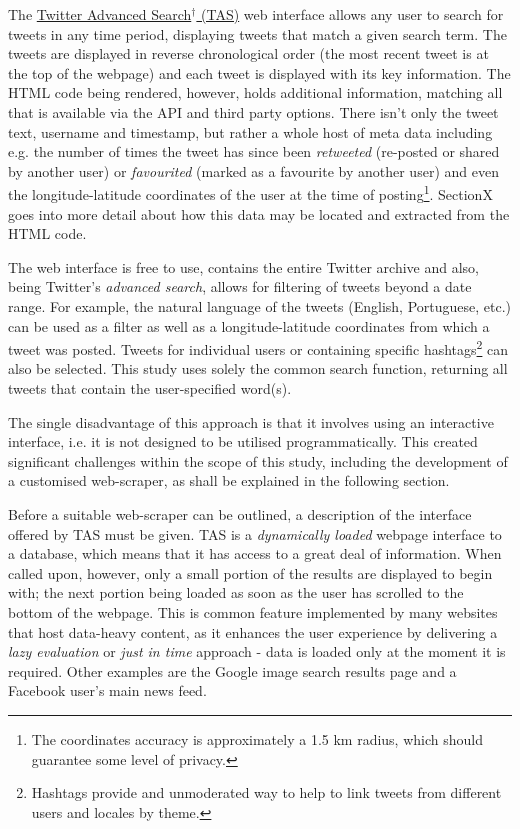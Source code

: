 \documentclass{article}
\begin{document}
The \href{https://twitter.com/search-advanced?lang\%3Den}{Twitter Advanced Search$^{\dag{}}$ (TAS)} web interface allows any user to search for tweets in any time period, displaying tweets that match a given search term. The tweets are displayed in reverse chronological order (the most recent tweet is at the top of the webpage) and each tweet is displayed with its key information. The HTML code being rendered, however, holds additional information, matching all that is available via the API and third party options. There isn't only the tweet text, username and timestamp, but rather a whole host of meta data including e.g. the number of times the tweet has since been \emph{retweeted} (re-posted or shared by another user) or \emph{favourited} (marked as a favourite by another user) and even the longitude-latitude coordinates of the user at the time of posting\footnote{The coordinates accuracy is approximately a 1.5 km radius, which should guarantee some level of privacy.}. SectionX goes into more detail about how this data may be located and extracted from the HTML code.

The web interface is free to use, contains the entire Twitter archive and also, being Twitter's \emph{advanced search}, allows for filtering of tweets beyond a date range. For example, the natural language of the tweets (English, Portuguese, etc.) can be used as a filter as well as a longitude-latitude coordinates from which a tweet was posted. Tweets for individual users or containing specific hashtags\footnote{Hashtags provide and unmoderated way to help to link tweets from different users and locales by theme.} can also be selected. This study uses solely the common search function, returning all tweets that contain the user-specified word(s).

The single disadvantage of this approach is that it involves using an interactive interface, i.e. it is not designed to be utilised programmatically. This created significant challenges within the scope of this study, including the development of a customised web-scraper, as shall be explained in the following section.

Before a suitable web-scraper can be outlined, a description of the interface offered by TAS must be given. TAS is a \emph{dynamically loaded} webpage interface to a database, which means that it has access to a great deal of information. When called upon, however, only a small portion of the results are displayed to begin with; the next portion being loaded as soon as the user has scrolled to the bottom of the webpage. This is common feature implemented by many websites that host data-heavy content, as it enhances the user experience by delivering a \emph{lazy evaluation} or \emph{just in time} approach - data is loaded only at the moment it is required. Other examples are the Google image search results page and a Facebook user's main news feed.
\end{document}
